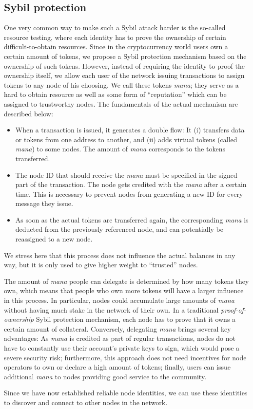 \documentclass[../main.tex]{subfiles}
\begin{document}
\subsection{Sybil protection}\label{sec:sybil}

One very common way to make such a Sybil attack harder is the so-called resource testing, where each identity has to prove the ownership of certain difficult-to-obtain resources.
Since in the cryptocurrency world users own a certain amount of tokens, we propose a Sybil protection mechanism based on the ownership of such tokens.
However, instead of requiring the identity to proof the ownership itself, we allow each user of the network issuing transactions to assign tokens to any node of his choosing.
We call these tokens \textit{mana}; they serve as a hard to obtain resource as well as some form of \enquote{reputation} which can be assigned to trustworthy nodes.
The fundamentals of the actual mechanism are described below:

\begin{itemize}
    \item When a transaction is issued, it generates a double flow:
    It (i) transfers data or tokens from one address to another, and (ii) adds virtual tokens (called \textit{mana}) to some nodes.
    The amount of \textit{mana} corresponds to the tokens transferred.
    
    \item The node ID that should receive the \textit{mana} must be specified in the signed part of the transaction.
    The node gets credited with the \textit{mana} after a certain time.
    This is necessary to prevent nodes from generating a new ID for every message they issue.
    
    \item As soon as the actual tokens are transferred again, the corresponding \textit{mana} is deducted from the previously referenced node, and can potentially be reassigned to a new node.
\end{itemize}

We stress here that this process does not influence the actual balances in any way, but it is only used to give higher weight to \enquote{trusted} nodes.

The amount of \textit{mana} people can delegate is determined by how many tokens they own, which means that people who own more tokens will have a larger influence in this process.
In particular, nodes could accumulate large amounts of \textit{mana} without having much stake in the network of their own.
In a traditional \textit{proof-of-ownership} Sybil protection mechanism, each node has to prove that it owns a certain amount of collateral. Conversely, delegating \textit{mana} brings several key advantages: As \textit{mana} is credited as part of regular transactions, nodes do not have to constantly use their account's private keys to sign, which would pose a severe security risk;
furthermore, this approach does not need incentives for node operators to own or declare a high amount of tokens; finally, users can issue additional \textit{mana} to nodes providing good service to the community.

Since we have now established reliable node identities, we can use these identities to discover and connect to other nodes in the network.
\end{document}
